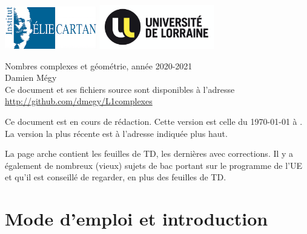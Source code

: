 \documentclass[11pt,a4paper,oneside]{book}
\theoremstyle{definition}
\theoremstyle{plain}
\begin{document}



\begin{titlepage}


\includegraphics[width=4cm]{img/logo-IECL}
\hfill
\includegraphics[width=5cm]{img/logo-UL}\\
\vspace{3em}
\begin{center}
{\Huge Nombres complexes et géométrie, année 2020-2021}\\
\vspace{3em}
{Damien Mégy\\
\vspace{3em}
{\small \faGithub{}  Ce document et ses fichiers source sont disponibles à l'adresse\\
\url{http://github.com/dmegy/L1complexes}\\}
}

\vspace{3em}
Ce document est en cours de rédaction. Cette version est celle du \today{} à \currenttime{}. La version la plus récente est à l'adresse indiquée plus haut.\\
\begin{mdframed}
La page arche contient les feuilles de TD, les dernières avec corrections. Il y a également de nombreux (vieux) sujets de bac portant sur le programme de l'UE et qu'il est conseillé de regarder, en plus des feuilles de TD.
\end{mdframed}
\vspace{3em}
\end{center}
\end{titlepage}

\tableofcontents
\restoregeometry

\section{Mode d'emploi et introduction}
\end{document}
